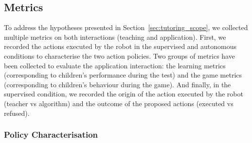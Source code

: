 
\subsection{Metrics}


To address the hypotheses presented in Section~\ref{sec:tutoring_scope}, we collected multiple metrics on both interactions (teaching and application). First, we recorded the actions executed by the robot in the supervised and autonomous conditions to characterise the two action policies. Two groups of metrics have been collected to evaluate the application interaction: the learning metrics (corresponding to children's performance during the test) and the game metrics (corresponding to children's behaviour during the game). And finally, in the supervised condition, we recorded the origin of the action executed by the robot (teacher vs algorithm) and the outcome of the proposed actions (executed vs refused).

\subsubsection{Policy Characterisation}

